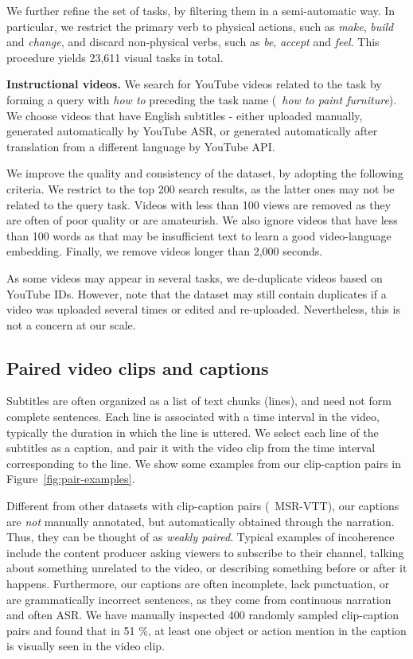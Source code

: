 \documentclass[10pt,twocolumn,letterpaper]{article}
\begin{document}
We further refine the set of tasks, by filtering them in a semi-automatic way.
In particular, we restrict the primary verb to physical actions, such as \textit{make}, \textit{build} and \textit{change}, and discard non-physical verbs, such as \textit{be}, \textit{accept} and \textit{feel}.
This procedure yields 23,611 visual tasks in total.

\vspace{1mm}
\noindent
\textbf{Instructional videos.}
We search for YouTube videos related to the task by forming a query with \emph{how to} preceding the task name (\eg~\textit{how to paint furniture}).
We choose videos that have English subtitles - either uploaded manually, generated automatically by YouTube ASR, or generated automatically after translation from a different language by YouTube API.

We improve the quality and consistency of the dataset, by adopting the following criteria.
We restrict to the top 200 search results, as the latter ones may not be related to the query task.
Videos with less than 100 views are removed as they are often of poor quality or are amateurish.
We also ignore videos that have less than 100 words as that may be insufficient text to learn a good video-language embedding.
Finally, we remove videos longer than 2,000 seconds.

As some videos may appear in several tasks, we de-duplicate videos based on YouTube IDs.
However, note that the dataset may still contain duplicates if a video was uploaded several times or edited and re-uploaded.
Nevertheless, this is not a concern at our scale.




\subsection{Paired video clips and captions}

Subtitles are often organized as a list of text chunks (lines), and need not form complete sentences.
Each line is associated with a time interval in the video, typically the duration in which the line is uttered.
We select each line of the subtitles as a caption, and pair it with the video clip from the time interval corresponding to the line.
We show some examples from our clip-caption pairs in Figure~\ref{fig:pair-examples}.


Different from other datasets with clip-caption pairs (\eg~MSR-VTT), our captions are \emph{not} manually annotated, but automatically obtained through the narration.
Thus, they can be thought of as \emph{weakly paired}.
Typical examples of incoherence include the content producer asking viewers to subscribe to their channel, talking about something unrelated to the video, or describing something before or after it happens.
Furthermore, our captions are often incomplete, lack punctuation, or are grammatically incorrect sentences, as they come from continuous narration and often ASR.
We have manually inspected 400 randomly sampled clip-caption pairs and found that in 51 \%, at least one object or action mention in the caption is visually seen in the video clip.
\end{document}
